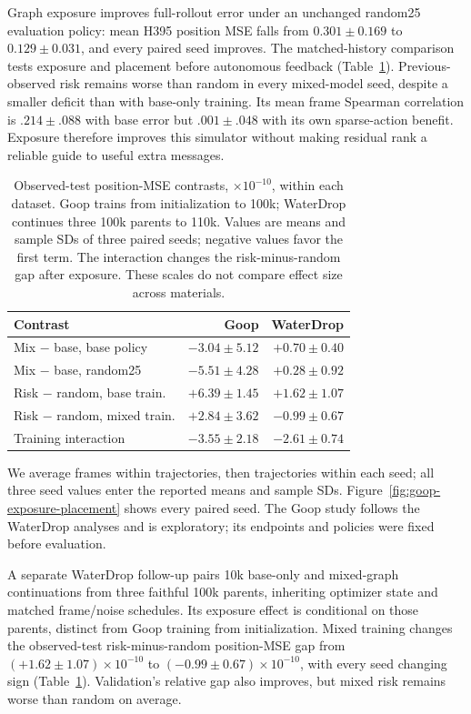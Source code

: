 Graph exposure improves full-rollout error under an unchanged random25 evaluation policy: mean H395 position MSE falls from $0.301\pm0.169$ to $0.129\pm0.031$, and every paired seed improves. The matched-history comparison tests exposure and placement before autonomous feedback (Table~\ref{tab:goop-exposure-placement}). Previous-observed risk remains worse than random in every mixed-model seed, despite a smaller deficit than with base-only training. Its mean frame Spearman correlation is $.214\pm.088$ with base error but $.001\pm.048$ with its own sparse-action benefit. Exposure therefore improves this simulator without making residual rank a reliable guide to useful extra messages.

\begin{table}[t]
\centering\small
\caption{Observed-test position-MSE contrasts, $\times10^{-10}$, within each dataset. Goop trains from initialization to 100k; WaterDrop continues three 100k parents to 110k. Values are means and sample SDs of three paired seeds; negative values favor the first term. The interaction changes the risk-minus-random gap after exposure. These scales do not compare effect size across materials.}
\label{tab:goop-exposure-placement}
\setlength{\tabcolsep}{3pt}
\begin{tabular}{lrr}
\toprule
Contrast & Goop & WaterDrop\\
\midrule
Mix $-$ base, base policy & $-3.04\pm5.12$ & $+0.70\pm0.40$\\
Mix $-$ base, random25 & $-5.51\pm4.28$ & $+0.28\pm0.92$\\
Risk $-$ random, base train. & $+6.39\pm1.45$ & $+1.62\pm1.07$\\
Risk $-$ random, mixed train. & $+2.84\pm3.62$ & $-0.99\pm0.67$\\
Training interaction & $-3.55\pm2.18$ & $-2.61\pm0.74$\\
\bottomrule
\end{tabular}
\end{table}

We average frames within trajectories, then trajectories within each seed; all three seed values enter the reported means and sample SDs. Figure~\ref{fig:goop-exposure-placement} shows every paired seed. The Goop study follows the WaterDrop analyses and is exploratory; its endpoints and policies were fixed before evaluation.

A separate WaterDrop follow-up pairs 10k base-only and mixed-graph continuations from three faithful 100k parents, inheriting optimizer state and matched frame/noise schedules. Its exposure effect is conditional on those parents, distinct from Goop training from initialization. Mixed training changes the observed-test risk-minus-random position-MSE gap from $(+1.62\pm1.07)\times10^{-10}$ to $(-0.99\pm0.67)\times10^{-10}$, with every seed changing sign (Table~\ref{tab:goop-exposure-placement}). Validation's relative gap also improves, but mixed risk remains worse than random on average.

